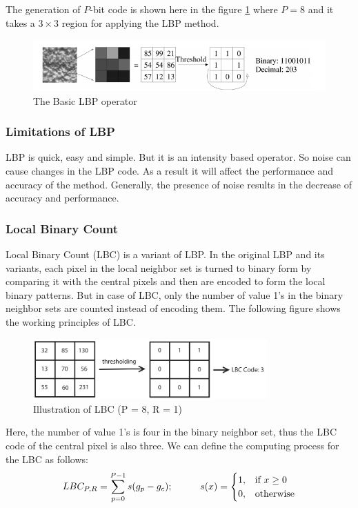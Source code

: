 \documentclass[12pt]{article}
\newcommand\tab[1][1cm]{\hspace*{#1}}
\begin{document}
The generation of $P$-bit code is shown here in the figure \ref{figure:2.3} where $P=8$ and it takes a $3\times3$ region for applying the LBP method.

\begin{figure}[h]
	\centering
	\includegraphics[width=.8\textwidth]{lbp_codes}
	\caption{The Basic LBP operator}%
	\label{figure:2.3}
\end{figure}


\subsubsection*{Limitations of LBP}
LBP is quick, easy and simple. But it is an intensity based operator. So noise can cause changes in the LBP code. As a result it will affect the performance and accuracy of the method. Generally, the presence of noise results in the decrease of accuracy and performance.\\

\subsubsection{Local Binary Count}
Local Binary Count (LBC)\cite{lbc01} is a variant of LBP. In the original LBP and its variants, each pixel in the local
neighbor set is turned to binary form by comparing it with the central
pixels and then are encoded to form the local binary
patterns. But in case of LBC, only the number of value 1's
in the binary neighbor sets are counted instead of encoding them. The following figure shows the working principles of LBC.
\begin{figure}[H]
	\centering
	\includegraphics[width=0.8\textwidth]{lbc_new}
	\caption{Illustration of LBC (P = 8, R = 1)}
	\label{figure:illustratin of LBC}
\end{figure}
Here, the number of value 1's is
four in the binary neighbor set, thus the LBC code of the central pixel
is also three. We can define the computing process for the LBC as
follows:\\
\begin{equation}
LBC_{P,R}=\sum\limits_{p=0}^{P-1}{s({{g}_{p}}-{{g}_{c}})}; \tab  s(x)= 
\begin{cases}
1,& \text{if } x\geq 0\\
0,              & \text{otherwise}
\end{cases}
\label{equation:2.3}
\end{equation}
\end{document}
